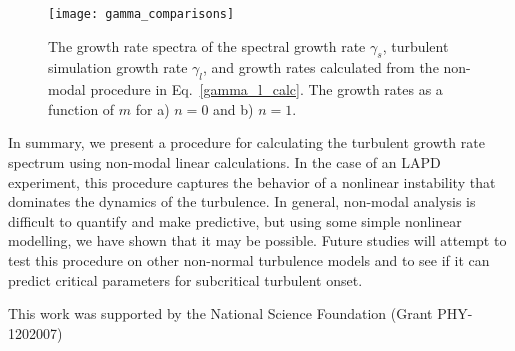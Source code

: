 \documentclass[letter,scriptaddress,twocolumn, prl,showkeys]{revtex4}
\begin{document}
\begin{figure}
\centerline{\texttt{[image: gamma\_comparisons]}}
\caption{The growth rate spectra of the spectral growth rate $\gamma_s$, turbulent simulation growth rate $\gamma_l$, and growth rates calculated from the non-modal procedure in Eq.~\ref{gamma_l_calc}.
The growth rates as a function of $m$ for a) $n=0$ and b) $n=1$.}
\label{gamma_comparisons}
\end{figure}

In summary, we present a procedure for calculating the turbulent growth rate spectrum using non-modal linear calculations. 
In the case of an LAPD experiment, this procedure captures the behavior of a nonlinear instability that dominates the dynamics of the turbulence.  In general,
non-modal analysis is difficult to quantify and make predictive, but using some simple nonlinear modelling, we have shown
that it may be possible. Future studies will attempt to test this procedure on other non-normal turbulence models and to see if it can predict critical parameters for subcritical turbulent onset.

This work was supported by the National Science Foundation (Grant PHY-1202007)




\end{document}

